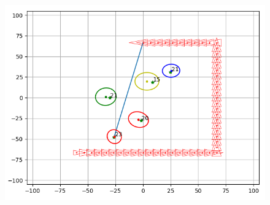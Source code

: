 \documentclass[11pt]{article}
\begin{document}
    
\begin{figure}
\centering
\includegraphics{5.png}
\end{figure}
\end{document}
